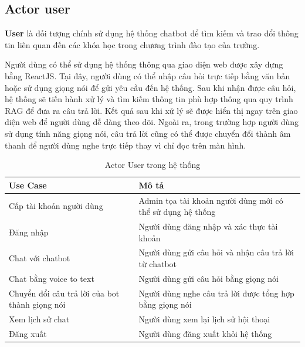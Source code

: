 \documentclass[../DoAn.tex]{subfiles}
\begin{document}
\subsection{Actor user}
\textbf{User} là đối tượng chính sử dụng hệ thống chatbot để tìm kiếm và trao đổi thông tin liên quan đến các khóa học trong chương trình đào tạo của trường.

Người dùng có thể sử dụng hệ thống thông qua giao diện web được xây dựng bằng ReactJS. Tại đây, người dùng có thể nhập câu hỏi trực tiếp bằng văn bản hoặc sử dụng giọng nói để gửi yêu cầu đến hệ thống. Sau khi nhận được câu hỏi, hệ thống sẽ tiến hành xử lý và tìm kiếm thông tin phù hợp thông qua quy trình RAG để đưa ra câu trả lời. Kết quả sau khi xử lý sẽ được hiển thị ngay trên giao diện web để người dùng dễ dàng theo dõi. Ngoài ra, trong trường hợp người dùng sử dụng tính năng giọng nói, câu trả lời cũng có thể được chuyển đổi thành âm thanh để người dùng nghe trực tiếp thay vì chỉ đọc trên màn hình.
\begin{table}[htbp]
    \centering
    \renewcommand{\arraystretch}{1.8} %
    \label{tab:usecase_list}
    \begin{tabular}{|>{\centering\arraybackslash}m{4cm}|>{\centering\arraybackslash}m{9cm}|}
        \hline
        \textbf{Use Case}                              & \textbf{Mô tả}                                             \\
        \hline
        Cấp tài khoản người dùng                       & Admin tọa tài khoản người dùng mới có thể sử dụng hệ thống \\
        \hline
        Đăng nhập                                      & Người dùng đăng nhập và xác thực tài khoản                 \\
        \hline
        Chat với chatbot                               & Người dùng gửi câu hỏi và nhận câu trả lời từ chatbot      \\
        \hline
        Chat bằng voice to text                        & Người dùng gửi câu hỏi bằng giọng nói                      \\
        \hline
        Chuyển đổi câu trả lời của bot thành giọng nói & Người dùng nghe câu trả lời được tổng hợp bằng giọng nói   \\
        \hline
        Xem lịch sử chat                               & Người dùng xem lại lịch sử hội thoại                       \\
        \hline
        Đăng xuất                                      & Người dùng đăng xuất khỏi hệ thống                         \\
        \hline
    \end{tabular}
    \caption{Actor User trong hệ thống}
\end{table}
\end{document}
